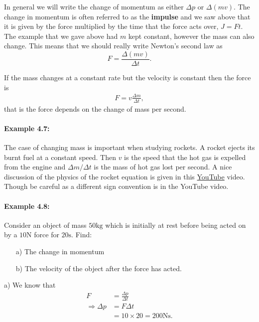 \documentclass[a4paper,12pt]{book}
\begin{document}
In general we will write the change of momentum as either $\Delta p$ or $\Delta \left(mv\right)$. The change in momentum is often referred to as the \textbf{impulse} and we saw above that it is given by the force multiplied by the time that the force acts over, $J=F t$. The example that we gave above had $m$ kept constant, however the mass can also change. This means that we should really write Newton's second law as
\begin{equation*}
F=\frac{\Delta\left(mv\right)}{\Delta t}.
\end{equation*}

If the mass changes at a constant rate but the velocity is constant then the force is 
\begin{align*}
F=v\frac{\Delta m}{\Delta t},
\end{align*}
that is the force depends on the change of mass per second.

\paragraph{Example 4.7:} The case of changing mass is important when studying rockets. A rocket ejects its burnt fuel at a constant speed. Then $v$ is the speed that the hot gas is expelled from the engine and $\Delta m/\Delta t$ is the mass of hot gas lost per second.  A nice discussion of the physics of the rocket equation is given in this \href{https://www.youtube.com/watch?v=V_brZ-KWY3g}{YouTube} video. Though be careful as a different sign convention is in the YouTube video.

\paragraph{Example 4.8:} Consider an object of mass $50 \text{kg}$ which is initially at rest before being acted on by a $10\text{N}$ force for $20\text{s}$. Find:
\begin{itemize}
\setlength{\itemsep}{-5pt}
    \item[a)] The change in momentum
    \item[b)] The velocity of the object after the force has acted.
\end{itemize} 

a) We know that 
\begin{align*}
F&=\frac{\Delta p}{\Delta t}\\
\Rightarrow \Delta p&=F\Delta t\\
&=10\times 20 =200 \text{Ns}.
\end{align*}
\end{document}

